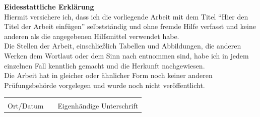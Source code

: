 \documentclass[11pt,twoside]{article}
\newcommand{\titelderarbeit}{Hier den Titel der Arbeit einfügen}
\begin{document}
\clearpage
\printbibliography[heading=bibintoc]

\clearpage
\textbf{Eidesstattliche Erklärung}\\

Hiermit versichere ich, dass ich die vorliegende Arbeit mit dem Titel ``\titelderarbeit''
selbstständig und ohne fremde Hilfe verfasst und keine anderen als die angegebenen Hilfsmittel
verwendet habe.\\

Die Stellen der Arbeit, einschließlich Tabellen und Abbildungen, die anderen Werken dem Wortlaut
oder dem Sinn nach entnommen sind, habe ich in jedem einzelnen Fall kenntlich gemacht und die
Herkunft nachgewiesen.\\

Die Arbeit hat in gleicher oder ähnlicher Form noch keiner anderen Prüfungsbehörde vorgelegen und
wurde noch nicht veröffentlicht.\\


\vspace{1.5cm}
\begin{tabular}{@{}p{4cm}p{1cm}p{8cm}@{}}
	\hrulefill &  & \hrulefill                \\
	Ort/Datum  &  & Eigenhändige Unterschrift \\
\end{tabular}
\end{document}
